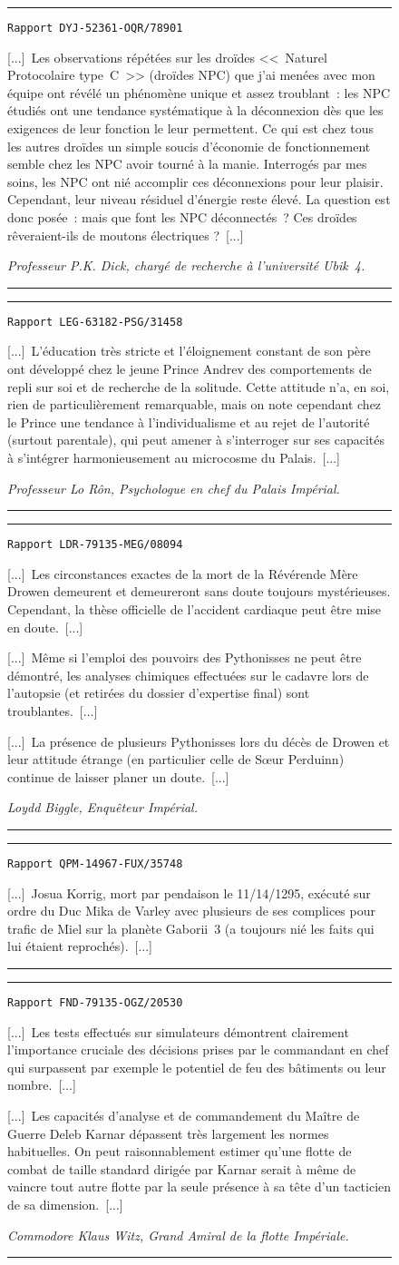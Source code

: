 \documentclass{article}
\newcommand{\indice}[3]{
    \begin{figure}[H]
        \begin{center}
            \rule{0.5\textwidth}{1pt}
        \end{center}
        \begin{framed}
            \begin{samepage}
                \texttt{Rapport #1}
                \nopagebreak

                [...]~#2~[...]

                \nopagebreak
                \hfill\textit{#3}
            \end{samepage}
        \end{framed}
        \caption{}
        \begin{center}
            \rule{0.5\textwidth}{1pt}
        \end{center}
    \end{figure}
}
\begin{document}
\indice
{DYJ-52361-OQR/78901}
{Les observations répétées sur les droïdes <<~Naturel Protocolaire
type~C~>> (droïdes NPC) que j’ai menées avec mon équipe ont révélé un
phénomène unique et assez troublant~: les NPC étudiés ont une tendance
systématique à la déconnexion dès que les exigences de leur fonction le
leur permettent. Ce qui est chez tous les autres droïdes un simple soucis
d’économie de fonctionnement semble chez les NPC avoir tourné à la manie.
Interrogés par mes soins, les NPC ont nié accomplir ces déconnexions pour
leur plaisir. Cependant, leur niveau résiduel d’énergie reste élevé. La
question est donc posée~: mais que font les NPC déconnectés~? Ces droïdes
rêveraient-ils de moutons électriques ?} 
{Professeur P.K. Dick, chargé de recherche à l’université Ubik~4.}

\indice
{LEG-63182-PSG/31458}
{L’éducation très stricte et l’éloignement constant de son père ont
développé chez le jeune Prince Andrev des comportements de repli sur soi et
de recherche de la solitude. Cette attitude n’a, en soi, rien de
particulièrement remarquable, mais on note cependant chez le Prince une
tendance à l’individualisme et au rejet de l’autorité (surtout parentale),
qui peut amener à s’interroger sur ses capacités à s’intégrer
harmonieusement au microcosme du Palais.}
{Professeur Lo Rôn, Psychologue en chef du Palais Impérial.}

\indice
{LDR-79135-MEG/08094}
{Les circonstances exactes de la mort de la Révérende Mère Drowen
demeurent et demeureront sans doute toujours mystérieuses. Cependant, la
thèse officielle de l’accident cardiaque peut être mise en doute.~[...]

\nobreak

[...]~Même si l’emploi des pouvoirs des Pythonisses ne peut être démontré,
les analyses chimiques effectuées sur le cadavre lors de l’autopsie (et
retirées du dossier d’expertise final) sont troublantes.~[...]

\nobreak

[...]~La présence de plusieurs Pythonisses lors du décès de Drowen et leur
attitude étrange (en particulier celle de S\oe{}ur Perduinn) continue de
laisser planer un doute.}
{Loydd Biggle, Enquêteur Impérial.}

\indice
{QPM-14967-FUX/35748}
{Josua Korrig, mort par pendaison le 11/14/1295, exécuté sur ordre du Duc
Mika de Varley avec plusieurs de ses complices pour trafic de Miel sur la
planète Gaborii~3 (a toujours nié les faits qui lui étaient reprochés).}
{}

\indice
{FND-79135-OGZ/20530}
{Les tests effectués sur simulateurs démontrent clairement l’importance
cruciale des décisions prises par le commandant en chef qui surpassent par
exemple le potentiel de feu des bâtiments ou leur nombre.~[...]

\nobreak

[...]~Les capacités d’analyse et de commandement du Maître de Guerre Deleb
Karnar dépassent très largement les normes habituelles. On peut
raisonnablement estimer qu’une flotte de combat de taille standard dirigée par
Karnar serait à même de vaincre tout autre flotte par la seule présence à sa
tête d’un tacticien de sa dimension.}
{Commodore Klaus Witz, Grand Amiral de la flotte Impériale.}
\end{document}
